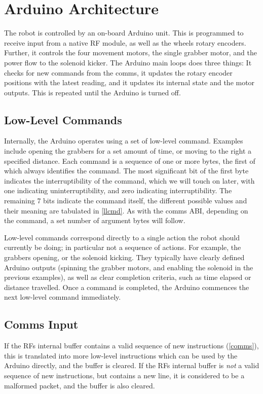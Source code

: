 \section{Arduino Architecture}

The robot is controlled by an on-board Arduino unit. This is programmed to
receive input from a native RF module, as well as the wheels rotary encoders.
Further, it controls the four movement motors, the single grabber motor, and
the power flow to the solenoid kicker. The Arduino main loops does three
things: It checks for new commands from the comms, it updates the rotary
encoder positions with the latest reading, and it updates its internal state
and the motor outputs. This is repeated until the Arduino is turned off.

\subsection{Low-Level Commands}

Internally, the Arduino operates using a set of low-level command. Examples
include opening the grabbers for a set amount of time, or moving to the right a
specified distance. Each command is a sequence of one or more bytes, the first
of which always identifies the command. The most significant bit of the first
byte indicates the interruptibility of the command, which we will touch on
later, with one indicating uninterruptibility, and zero indicating
interruptibility. The remaining 7 bits indicate the command itself, the
different possible values and their meaning are tabulated in \cref{llcmd}. As
with the comms ABI, depending on the command, a set number of argument bytes
will follow.

Low-level commands correspond directly to a single action the robot should
currently be doing; in particular not a sequence of actions. For example, the
grabbers opening, or the solenoid kicking. They typically have clearly defined
Arduino outputs (spinning the grabber motors, and enabling the solenoid in the
previous examples), as well as clear completion criteria, such as time elapsed
or distance travelled. Once a command is completed, the Arduino commences the
next low-level command immediately.

\subsection{Comms Input}

If the RFs internal buffer contains a valid sequence of new instructions
(\cref{comms}), this is translated into more low-level instructions which can
be used by the Arduino directly, and the buffer is cleared. If the RFs internal
buffer is \textit{not} a valid sequence of new instructions, but contains a new
line, it is considered to be a malformed packet, and the buffer is also
cleared.

